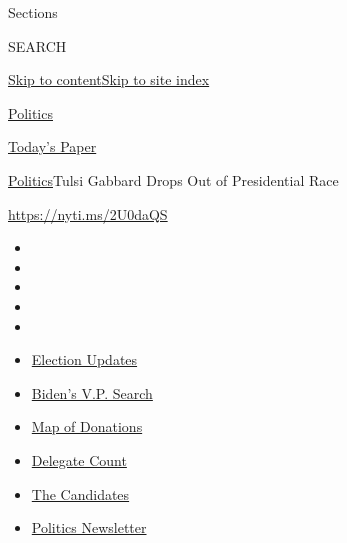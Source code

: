 Sections

SEARCH

\protect\hyperlink{site-content}{Skip to
content}\protect\hyperlink{site-index}{Skip to site index}

\href{https://www.nytimes.com/section/politics}{Politics}

\href{https://myaccount.nytimes.com/auth/login?response_type=cookie\&client_id=vi}{}

\href{https://www.nytimes.com/section/todayspaper}{Today's Paper}

\href{/section/politics}{Politics}\textbar{}Tulsi Gabbard Drops Out of
Presidential Race

\url{https://nyti.ms/2U0daQS}

\begin{itemize}
\item
\item
\item
\item
\item
\end{itemize}

\begin{itemize}
\item
  \href{https://www.nytimes.com/2020/07/31/us/elections/biden-vs-trump.html?action=click\&pgtype=Article\&state=default\&region=TOP_BANNER\&context=storylines_menu}{Election
  Updates}
\item
  \href{https://www.nytimes.com/article/biden-vice-president-2020.html?action=click\&pgtype=Article\&state=default\&region=TOP_BANNER\&context=storylines_menu}{Biden's
  V.P. Search}
\item
  \href{https://www.nytimes.com/interactive/2020/07/24/us/politics/trump-biden-campaign-donors.html?action=click\&pgtype=Article\&state=default\&region=TOP_BANNER\&context=storylines_menu}{Map
  of Donations}
\item
  \href{https://www.nytimes.com/interactive/2020/us/elections/delegate-count-primary-results.html?action=click\&pgtype=Article\&state=default\&region=TOP_BANNER\&context=storylines_menu}{Delegate
  Count}
\item
  \href{https://www.nytimes.com/interactive/2019/us/politics/2020-presidential-candidates.html?action=click\&pgtype=Article\&state=default\&region=TOP_BANNER\&context=storylines_menu}{The
  Candidates}
\item
  \href{https://www.nytimes.com/newsletters/politics?action=click\&pgtype=Article\&state=default\&region=TOP_BANNER\&context=storylines_menu}{Politics
  Newsletter}
\end{itemize}


